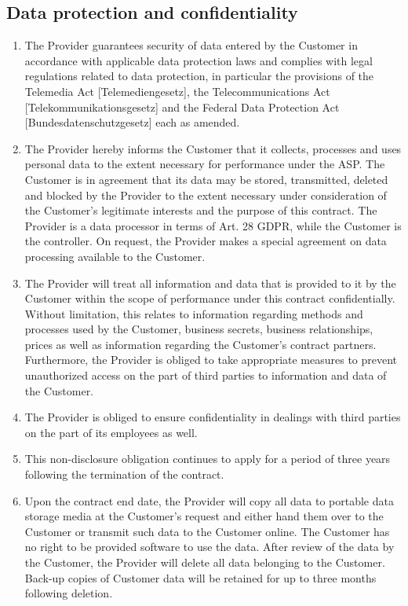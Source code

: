 \documentclass{terms}
\begin{document}
\subsection{Data protection and confidentiality}
\begin{enumerate}
\item The Provider guarantees security of data entered by the Customer in accordance with applicable data protection laws and complies with legal regulations related to data protection, in particular the provisions of the Telemedia Act [Telemediengesetz], the Telecommunications Act [Telekommunikationsgesetz] and the Federal Data Protection Act [Bundesdatenschutzgesetz] each as amended.
\item The Provider hereby informs the Customer that it collects, processes and uses personal data to the extent necessary for performance under the ASP. The Customer is in agreement that its data may be stored, transmitted, deleted and blocked by the Provider to the extent necessary under consideration of the Customer's legitimate interests and the purpose of this contract. The Provider is a data processor in terms of Art. 28 GDPR, while the Customer is the controller. On request, the Provider makes a special agreement on data processing available to the Customer.
\item The Provider will treat all information and data that is provided to it by the Customer within the scope of performance under this contract confidentially. Without limitation, this relates to information regarding methods and processes used by the Customer, business secrets, business relationships, prices as well as information regarding the Customer's contract partners. Furthermore, the Provider is obliged to take appropriate measures to prevent unauthorized access on the part of third parties to information and data of the Customer.
\item The Provider is obliged to ensure confidentiality in dealings with third parties on the part of its employees as well.
\item This non-disclosure obligation continues to apply for a period of three years following the termination of the contract. 
\item Upon the contract end date, the Provider will copy all data to portable data storage media at the Customer's request and either hand them over to the Customer or transmit such data to the Customer online. The Customer has no right to be provided software to use the data. After review of the data by the Customer, the Provider will delete all data belonging to the Customer. Back-up copies of Customer data will be retained for up to three months following deletion.
\end{enumerate}
\end{document}
